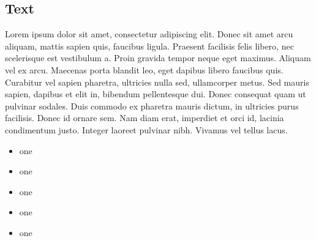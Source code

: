 \documentclass[a4paper,12pt]{article}
\begin{document}
\subsection{Text}
 Lorem ipsum dolor sit amet, consectetur adipiscing elit. Donec sit amet arcu aliquam, mattis sapien quis, faucibus ligula. Praesent facilisis felis libero, nec scelerisque est vestibulum a. Proin gravida tempor neque eget maximus. Aliquam vel ex arcu. Maecenas porta blandit leo, eget dapibus libero faucibus quis. Curabitur vel sapien pharetra, ultricies nulla sed, ullamcorper metus. Sed mauris sapien, dapibus et elit in, bibendum pellentesque dui. Donec consequat quam ut pulvinar sodales. Duis commodo ex pharetra mauris dictum, in ultricies purus facilisis. Donec id ornare sem. Nam diam erat, imperdiet et orci id, lacinia condimentum justo. Integer laoreet pulvinar nibh. Vivamus vel tellus lacus.

\begin{itemize}
    \item one
    \item one
    \item one
    \item one
    \item one
    
\end{itemize}
\end{document}
